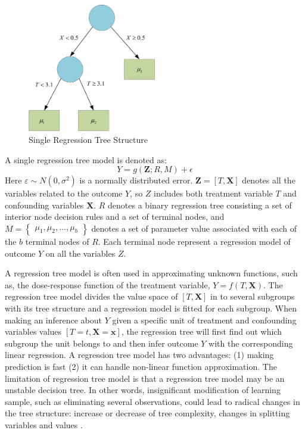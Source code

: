 \begin{figure}[!thpb]
\centering
\includegraphics[width=0.5\textwidth]{chapter4_SingleRGT.pdf}
\caption{Single Regression Tree Structure}
\label{singlergt}
\end{figure}

A single regression tree model is denoted as:
\begin{equation*}
Y=g(\pmb{Z}; R, M)+\epsilon
\end{equation*}
Here $\varepsilon  \sim N(0,{\sigma ^2})$ is a normally distributed error. $\pmb{Z}=[T,\pmb{X}]$ denotes all the variables related to the outcome $Y$, so $Z$ includes both treatment variable $T$ and confounding variables $\pmb{X}$. $R$ denotes a binary regression tree consisting a set of interior node decision rules and a set of terminal nodes, and $M=
\begin{Bmatrix}
 \mu _1, \mu _2, . . ., \mu _b
\end{Bmatrix}$
denotes a set of parameter value associated with each of the $b$ terminal nodes of $R$. Each terminal node represent a regression model of outcome $Y$ on all the variables $Z$.

A regression tree model is often used in approximating unknown functions, such as, the dose-response function of the treatment variable, $Y=f(T,\pmb{X})$. The regression tree model divides the value space of $[T,\pmb{X}]$ in to several subgroups with its tree structure and a regression model is fitted for each subgroup. When making an inference about $Y$ given a specific unit of treatment and confounding variables values $[T=t,\pmb{X}=\pmb{x}]$, the regression tree will first find out which subgroup the unit belongs to and then infer outcome $Y$ with the corresponding linear regression. A regression tree model has two advantages: (1) making prediction is fast (2) it can handle non-linear function approximation.  The limitation of regression tree model is that a regression tree model may be an unstable decision tree. In other words, insignificant modification of learning sample, such as eliminating several observations, could lead to radical changes in the tree structure: increase or decrease of tree complexity, changes in splitting variables and values \cite{timofeev2004classification}.


